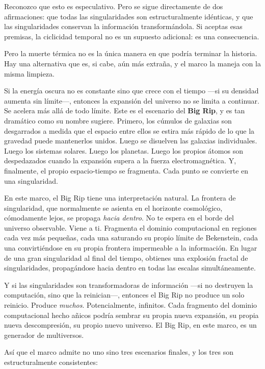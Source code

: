 \documentclass[11pt, twoside, openright]{book}
\begin{document}
Reconozco que esto es especulativo. Pero se sigue directamente de dos afirmaciones: que todas las singularidades son estructuralmente idénticas, y que las singularidades conservan la información transformándola. Si aceptas esas premisas, la ciclicidad temporal no es un supuesto adicional: es una consecuencia.

Pero la muerte térmica no es la única manera en que podría terminar la historia. Hay una alternativa que es, si cabe, aún más extraña, y el marco la maneja con la misma limpieza.

Si la energía oscura no es constante sino que crece con el tiempo ---si su densidad aumenta sin límite---, entonces la expansión del universo no se limita a continuar. Se acelera más allá de todo límite. Este es el escenario del \textbf{Big Rip}, y es tan dramático como su nombre sugiere. Primero, los cúmulos de galaxias son desgarrados a medida que el espacio entre ellos se estira más rápido de lo que la gravedad puede mantenerlos unidos. Luego se disuelven las galaxias individuales. Luego los sistemas solares. Luego los planetas. Luego los propios átomos son despedazados cuando la expansión supera a la fuerza electromagnética. Y, finalmente, el propio espacio-tiempo se fragmenta. Cada punto se convierte en una singularidad.

En este marco, el Big Rip tiene una interpretación natural. La frontera de singularidad, que normalmente se asienta en el horizonte cosmológico, cómodamente lejos, se propaga \textit{hacia dentro}. No te espera en el borde del universo observable. Viene a ti. Fragmenta el dominio computacional en regiones cada vez más pequeñas, cada una saturando su propio límite de Bekenstein, cada una convirtiéndose en su propia frontera impermeable a la información. En lugar de una gran singularidad al final del tiempo, obtienes una explosión fractal de singularidades, propagándose hacia dentro en todas las escalas simultáneamente.

Y si las singularidades son transformadoras de información ---si no destruyen la computación, sino que la reinician---, entonces el Big Rip no produce un solo reinicio. Produce \textit{muchos}. Potencialmente, infinitos. Cada fragmento del dominio computacional hecho añicos podría sembrar su propia nueva expansión, su propia nueva descompresión, su propio nuevo universo. El Big Rip, en este marco, es un generador de multiversos.

Así que el marco admite no uno sino tres escenarios finales, y los tres son estructuralmente consistentes:
\end{document}
